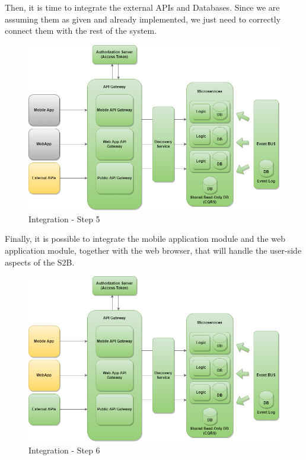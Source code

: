 Then, it is time to integrate the external APIs and Databases. Since we are assuming them as given and already implemented, we just need to correctly connect them with the rest of the system.

\begin{figure}[H]
	\centering
    \includegraphics[scale=0.4]{Images/Impl, Integr & Test/Integration Plan - Step 5.png}
	\caption{\label{fig:integration_plan_step_5}Integration - Step 5}
\end{figure}

Finally, it is possible to integrate the mobile application module and the web application module, together with the web browser, that will handle the user-side aspects of the S2B.

\begin{figure}[H]
	\centering
    \includegraphics[scale=0.4]{Images/Impl, Integr & Test/Integration Plan - Step 6.png}
	\caption{\label{fig:integration_plan_step_6}Integration - Step 6}
\end{figure}
